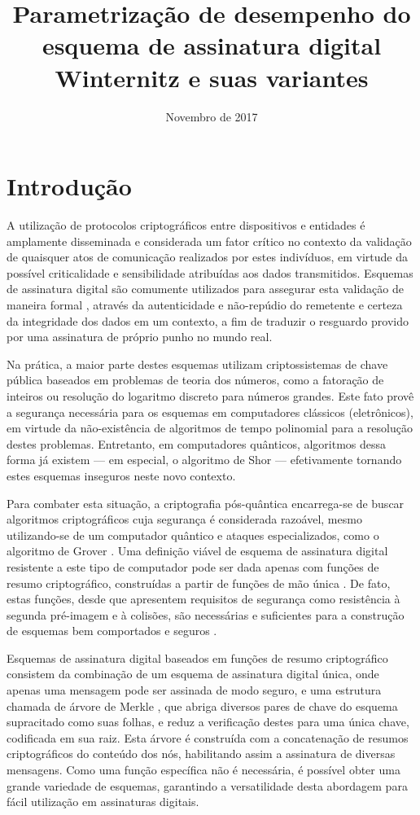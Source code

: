 \documentclass[12pt]{article}
\title{Parametrização de desempenho do esquema de
assinatura digital Winternitz e suas variantes}
\author{Novembro de 2017}
\date{}
\begin{document}
\maketitle

\section{Introdução}

A utilização de protocolos criptográficos entre dispositivos e entidades é
amplamente disseminada e considerada um fator crítico no contexto da validação
de quaisquer atos de comunicação realizados por estes indivíduos, em virtude da
possível criticalidade e sensibilidade atribuídas aos dados transmitidos.
Esquemas de assinatura digital são comumente utilizados para assegurar esta
validação de maneira formal \cite{Goldreich:2004:FCV:975541}, através da
autenticidade e não-repúdio do remetente e certeza da integridade dos dados em
um contexto, a fim de traduzir o resguardo provido por uma assinatura de
próprio punho no mundo real.

Na prática, a maior parte destes esquemas utilizam criptossistemas de chave
pública baseados em problemas de teoria dos números, como a fatoração de
inteiros ou resolução do logaritmo discreto para números grandes. Este fato
provê a segurança necessária para os esquemas em computadores clássicos
(eletrônicos), em virtude da não-existência de algoritmos de tempo polinomial
para a resolução destes problemas. Entretanto, em computadores quânticos,
algoritmos dessa forma já existem --- em especial, o algoritmo de Shor
\cite{Shor:1997:PAP:264393.264406} --- efetivamente tornando estes esquemas
inseguros neste novo contexto. 

Para combater esta situação, a criptografia pós-quântica encarrega-se de buscar
algoritmos criptográficos cuja segurança é considerada razoável, mesmo
utilizando-se de um computador quântico e ataques especializados, como o
algoritmo de Grover \cite{Grover:1996:FQM:237814.237866}. Uma definição viável
de esquema de assinatura digital resistente a este tipo de computador pode ser
dada apenas com funções de resumo criptográfico, construídas a partir de
funções de mão única \cite{cryptoeprint:2005:328}. De fato, estas funções,
desde que apresentem requisitos de segurança como resistência à segunda
pré-imagem e à colisões, são necessárias e suficientes para a construção de
esquemas bem comportados e seguros \cite{Rompel:1990:OFN:100216.100269}.

Esquemas de assinatura digital baseados em funções de resumo criptográfico
consistem da combinação de um esquema de assinatura digital única, onde apenas
uma mensagem pode ser assinada de modo seguro, e uma estrutura chamada de
árvore de Merkle \cite{Merkle:1989:CDS:118209.118230}, que abriga diversos
pares de chave do esquema supracitado como suas folhas, e reduz a verificação
destes para uma única chave, codificada em sua raiz. Esta árvore é construída
com a concatenação de resumos criptográficos do conteúdo dos nós, habilitando
assim a assinatura de diversas mensagens. Como uma função específica não é
necessária, é possível obter uma grande variedade de esquemas, garantindo a
versatilidade desta abordagem para fácil utilização em assinaturas digitais.
\end{document}
